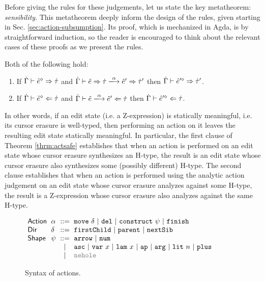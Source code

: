 Before giving the rules for these judgements, let us state the key metatheorem: \emph{sensibility}. This metatheorem deeply inform the design of the rules, given starting in Sec. \ref{sec:action-subsumption}. Its proof, which is mechanized in Agda, is by straightforward induction, so the reader is encouraged to think about the relevant cases of these proofs as we present the rules. 
\begin{theorem}\label{thrm:actsafe} Both of the following hold:\begin{enumerate}[itemsep=0px,partopsep=0px,topsep=0px]
\item If $\dot{\Gamma} \vdash \hat{e}^{\diamond} \Rightarrow \dot{\tau}$ and $\performSyn{\hGamma}{\zexp}{\htau}{\alpha}{\zexp'}{\htau'}$ 
   then
  $\dot{\Gamma} \vdash \hat{e}'^{\diamond} \Rightarrow \dot{\tau}'$.
\item If $\dot{\Gamma} \vdash \hat{e}^{\diamond} \Leftarrow \dot{\tau}$ and
   $\performAna{\hGamma}{\zexp}{\htau}{\alpha}{\zexp'}$ then
  $\dot{\Gamma} \vdash \hat{e}'^{\diamond} \Leftarrow \dot{\tau}$.
\end{enumerate}
\end{theorem}
\noindent In other words, if an edit state (i.e. a Z-expression) is statically meaningful, i.e. its cursor erasure is well-typed, then performing an action on it leaves the resulting edit state statically meaningful. In particular, the first clause of Theorem \ref{thrm:actsafe} establishes that when an action is performed on an edit state whose cursor erasure synthesizes an H-type, the result is an edit state whose cursor erasure also synthesizes some (possibly different) H-type. The second clause establishes that when an action is performed using the analytic action judgement on an edit state whose cursor erasure analyzes against some H-type, the result is a Z-expression whose cursor erasure also analyzes against the same H-type. %


\begin{figure}[t]
\hspace{-3px}$\arraycolsep=3pt\begin{array}{llcllll}
\mathsf{Action} & \alpha & ::= &
  \aMove{\delta} ~\vert~
  \aDel ~\vert~
  \aConstruct{\psi} ~\vert~
  \aFinish\\
\mathsf{Dir} & \delta & ::= &
  \dChild ~\vert~
  \dParent ~\vert~
  \dNext \\ %
\mathsf{Shape} & \psi & ::= &
  \farr ~\vert~
  \fnum \\
& & \vert &
  \fasc ~\vert~
  \fvar{x} ~\vert~
  \flam{x} ~\vert~
  \fap ~\vert~
  \farg ~\vert~
  \fnumlit{n} ~\vert~
  \fplus\\
& & \vert & 
  {\color{gray}\fnehole}
\end{array}$
\caption{Syntax of actions.}
\label{fig:action-syntax}
\end{figure}

